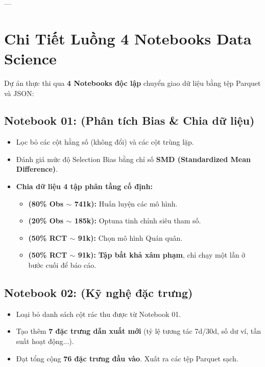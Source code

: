 \documentclass[11pt,a4paper]{article}
\begin{document}
---

\section{Chi Tiết Luồng 4 Notebooks Data Science}

Dự án thực thi qua \textbf{4 Notebooks độc lập} chuyển giao dữ liệu bằng tệp Parquet và JSON:

\subsection{Notebook 01:  (Phân tích Bias \& Chia dữ liệu)}
\begin{itemize}
    \item Lọc bỏ các cột hằng số (không đổi) và các cột trùng lặp.
    \item Đánh giá mức độ Selection Bias bằng chỉ số \textbf{SMD (Standardized Mean Difference)}.
    \item \textbf{Chia dữ liệu 4 tập phân tầng cố định:}
    \begin{itemize}
        \item \textbf{ (80\% Obs $\sim$ 741k):} Huấn luyện các mô hình.
        \item \textbf{ (20\% Obs $\sim$ 185k):} Optuna tinh chỉnh siêu tham số.
        \item \textbf{ (50\% RCT $\sim$ 91k):} Chọn mô hình Quán quân.
        \item \textbf{ (50\% RCT $\sim$ 91k):} \textbf{Tập bất khả xâm phạm}, chỉ chạy một lần ở bước cuối để báo cáo.
    \end{itemize}
\end{itemize}

\subsection{Notebook 02:  (Kỹ nghệ đặc trưng)}
\begin{itemize}
    \item Loại bỏ danh sách cột rác thu được từ Notebook 01.
    \item Tạo thêm \textbf{7 đặc trưng dẫn xuất mới} (tỷ lệ tương tác 7d/30d, số dư ví, tần suất hoạt động...).
    \item Đạt tổng cộng \textbf{76 đặc trưng đầu vào}. Xuất ra các tệp Parquet sạch.
\end{itemize}
\end{document}
